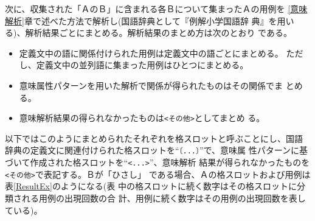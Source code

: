 \documentclass{nlp}
\begin{document}
  次に、収集された「ＡのＢ」に含まれる各Ｂについて集まったＡの用例を
  \ref{意味解析}章で述べた方法で解析し(国語辞典として『例解小学国語辞
  典』を用いる)、解析結果ごとにまとめる。解析結果のまとめ方は次のとおり
  である。
  
  \begin{itemize}
   \item 定義文中の語に関係付けられた用例は定義文中の語ごとにまとめる。
	 ただし、定義文中の並列語に集まった用例はひとつにまとめる。
   \item 意味属性パターンを用いた解析で関係が得られたものはその関係でま
	 とめる。
   \item 意味解析結果の得られなかったものは\texttt{<その他>}としてまとめ
	 る。
  \end{itemize}
  
  以下ではこのようにまとめられたそれぞれを格スロットと呼ぶことにし、国語
  辞典の定義文に関連付けられた格スロットを``\texttt{〔...〕}''で、意味属
  性パターンに基づいて作成された格スロットを``\texttt{<...>}''、意味解析
  結果が得られなかったものを\texttt{<その他>}で表記する。Ｂが「ひさし」
  である場合、Ａの格スロットおよび用例は表\ref{ResultEx}のようになる(表
  中の格スロットに続く数字はその格スロットに分類される用例の出現回数の合
  計、用例に続く数字はその用例の出現回数を表している)。
\end{document}
